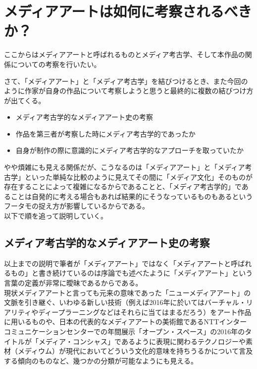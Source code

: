 \documentclass[a4paper,report]{jsbook}
\begin{document}
\section{メディアアートは如何に考察されるべきか？}\label{ux30e1ux30c7ux30a3ux30a2ux30a2ux30fcux30c8ux306fux5982ux4f55ux306bux8003ux5bdfux3055ux308cux308bux3079ux304dux304b}

ここからはメディアアートと呼ばれるものとメディア考古学、そして本作品の関係についての考察を行いたい。

さて、「メディアアート」と「メディア考古学」を結びつけるとき、また今回のように作家が自身の作品について考察しようと思うと最終的に複数の結びつけ方が出てくる。

\begin{itemize}
\tightlist
\item
  メディア考古学的なメディアアート史の考察
\item
  作品を第三者が考察した時にメディア考古学的であったか
\item
  自身が制作の際に意識的にメディア考古学的なアプローチを取っていたか
\end{itemize}

やや煩雑にも見える関係だが、こうなるのは「メディアアート」と「メディア考古学」といった単純な比較のように見えてその間に「メディア文化」そのものが存在することによって複雑になるからであることと、「メディア考古学的」であることは自発的に考える場合もあれば結果的にそうなっているものもあるというフータモの捉え方が影響しているからである。\\
以下で順を追って説明していく。

\subsection{メディア考古学的なメディアアート史の考察}\label{ux30e1ux30c7ux30a3ux30a2ux8003ux53e4ux5b66ux7684ux306aux30e1ux30c7ux30a3ux30a2ux30a2ux30fcux30c8ux53f2ux306eux8003ux5bdf}

以上までの説明で筆者が「メディアアート」ではなく「メディアアートと呼ばれるもの」と書き続けているのは序論でも述べたように「メディアアート」という言葉の定義が非常に曖昧であるからである。\\
現状メディアアートと言っても元来の意味であった「ニューメディアアート」の文脈を引き継ぐ、いわゆる新しい技術（例えば2016年に於いてはバーチャル・リアリティやディープラーニングなどはそれらに当てはまるだろう）をアート作品に用いるものや、日本の代表的なメディアアートの美術館であるNTTインターコミュニケーションセンターでの年間展示「オープン・スペース」の2016年のタイトルが「メディア・コンシャス」であるように表現に関わるテクノロジーや素材（メディウム）が現代においてどういう文化的意味を持ちうるかについて言及する傾向のものなど、幾つかの分類が可能なようにも見える。
\end{document}
